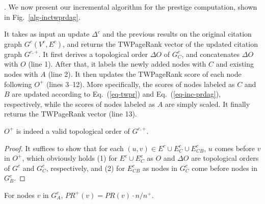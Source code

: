 {. We now present our incremental algorithm for the prestige computation, shown in Fig.~\ref{alg-inctwprdag}.

It takes as input an update $\Delta^c$ and the previous results on the original citation graph $G^c(V^c,E^c)$, and returns the TWPageRank vector of the updated citation graph $G^{c,+}$. It first derives a topological order $\Delta O$ of $G^c_C$, and concatenates $\Delta O$ with $O$ (line 1). After that, it labels the newly added nodes with $C$ and existing nodes with $A$ (line 2). It then updates the TWPageRank score of each node following $O^+$ (lines 3--12). More specifically, the scores of nodes labeled as $C$ and $B$ are updated according to Eq.~(\ref{eq-twpr}) and Eq.~(\ref{eq-inc-prdag}), respectively, while the scores of nodes labeled as $A$ are simply scaled. It finally returns the TWPageRank vector (line 13).




\begin{lemma} \label{lemma-inc-topo}
$O^+$ is indeed a valid topological order of $G^{c,+}$.
\end{lemma}

\begin{proof}
It suffices to show that for each $(u,v)\in E^c\cup E^c_{C}\cup E^c_{CB}$, $u$ comes before $v$ in $O^+$,
which obviously holds (1) for  $E^c\cup E^c_{C}$ as $O$ and $\Delta O$ are topological orders of $G^c$ and $G^c_C$, respectively, and (2) for $E^c_{CB}$ as nodes in $G^c_C$ come before nodes in $G^c_B$.
\end{proof}

\begin{lemma} \label{lemma-subgraphA}
For nodes $v$ in $G^c_A$, $PR^+(v)= PR(v)\cdot {n}/{n^+} $.
\end{lemma}

}
